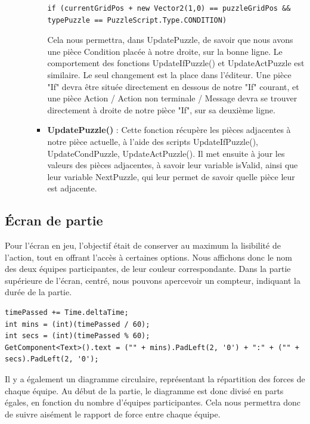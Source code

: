 \documentclass{report}
\begin{document}
\begin{enumerate}[label=\Alph*)]
\begin{itemize}
\begin{itemize}
\begin{lstlisting}[frame=single]
if (currentGridPos + new Vector2(1,0) == puzzleGridPos && typePuzzle == PuzzleScript.Type.CONDITION)
\end{lstlisting}

\smallbreak
Cela nous permettra, dans UpdatePuzzle, de savoir que nous avons une pièce Condition placée à notre droite, sur la bonne ligne.
Le comportement des fonctions UpdateIfPuzzle() et UpdateActPuzzle est similaire. Le seul changement est la place dans l'éditeur. Une pièce "If" devra être située directement en dessous de notre "If" courant, et une pièce Action / Action non terminale / Message devra se trouver directement à droite de notre pièce "If", sur sa deuxième ligne.
\item\textbf{UpdatePuzzle()} : \newline
Cette fonction récupère les pièces adjacentes à notre pièce actuelle, à l'aide des scripts UpdateIfPuzzle(), UpdateCondPuzzle, UpdateActPuzzle(). Il met ensuite à jour les valeurs des pièces adjacentes, à savoir leur variable isValid, ainsi que leur variable NextPuzzle, qui leur permet de savoir quelle pièce leur est adjacente.

\end{itemize}
\end{itemize}
\end{enumerate}


\subsection{Écran de partie}
Pour l'écran en jeu, l'objectif était de conserver au maximum la lisibilité de l'action, tout en offrant l'accès à certaines options.
Nous affichons donc le nom des deux équipes participantes, de leur couleur correspondante. Dans la partie supérieure de l'écran, centré, nous pouvons apercevoir un compteur, indiquant la durée de la partie.

\begin{lstlisting}[language={[Sharp]C},label={lst:Update()}, caption= Extrait du code de TimerScriptHUD.cs]
timePassed += Time.deltaTime;
int mins = (int)(timePassed / 60);
int secs = (int)(timePassed % 60);
GetComponent<Text>().text = ("" + mins).PadLeft(2, '0') + ":" + ("" + secs).PadLeft(2, '0'); 
\end{lstlisting}	

Il y a également un diagramme circulaire, représentant la répartition des forces de chaque équipe. Au début de la partie, le diagramme est donc divisé en parts égales, en fonction du nombre d'équipes participantes. Cela nous permettra donc de suivre aisément le rapport de force entre chaque équipe.
\end{document}
